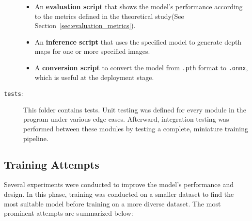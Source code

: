 \begin{description}
\begin{itemize}
        \item An \textbf{evaluation script} that shows the model's performance according to the metrics defined in the theoretical study(See Section~\ref{sec:evaluation_metrics}).
        \item An \textbf{inference script} that uses the specified model to generate depth maps for one or more specified images.
        \item A \textbf{conversion script} to convert the model from \texttt{.pth} format to \texttt{.onnx}, which is useful at the deployment stage.
    \end{itemize}
    \item[\texttt{tests}:] This folder contains tests. Unit testing was defined for every module in the program under various edge cases. Afterward, integration testing was performed between these modules by testing a complete, miniature training pipeline.
\end{description}

\subsection{Training Attempts}
\label{subsec:training_attempts}

Several experiments were conducted to improve the model's performance and design. In this phase, training was conducted on a smaller dataset to find the most suitable model before training on a more diverse dataset. The most prominent attempts are summarized below:

